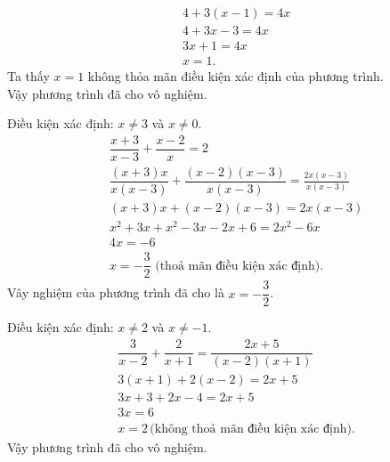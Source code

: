 \begin{vd}
{\begin{listEX}
\begin{align*}
	&4+3(x-1) = 4x\\
	&4+3x-3 = 4x\\
	&3x+1 =4x\\
	&x = 1.
	\end{align*}
	Ta thấy $x=1$ không thỏa mãn điều kiện xác định của phương trình.\\
	Vậy phương trình đã cho vô nghiệm.
	\item Điều kiện xác định: $x \neq 3$ và $x \neq 0$.
	\begin{align*}
	&\dfrac{x+3}{x-3}+\dfrac{x-2}{x}=2 \\
	& \dfrac{(x+3) x}{x(x-3)}+\dfrac{(x-2)(x-3)}{x(x-3)}=\frac{2 x(x-3)}{x(x-3)} \\
	& (x+3) x+(x-2)(x-3)=2 x(x-3) \\
	& x^2+3 x+x^2-3 x-2 x+6=2 x^2-6 x \\
	& 4 x=-6 \\
	& x=-\dfrac{3}{2} \text { (thoả mãn điều kiện xác định). }
	\end{align*}
	Vây nghiệm của phương trình đã cho là $x=-\dfrac{3}{2}$.\\
	\item Điều kiện xác định: $x \neq 2$ và $x \neq-1$.
	\begin{align*}
	& \dfrac{3}{x-2}+\dfrac{2}{x+1}=\dfrac{2 x+5}{(x-2)(x+1)} \\
	& 3(x+1)+2(x-2)=2 x+5 \\
	& 3 x+3+2 x-4=2 x+5 \\
	& 3 x=6\\
	& x=2\, \text{(không thoả mãn điều kiện xác định).}
	\end{align*}
	Vậy phương trình đã cho vô nghiệm.
	\end{listEX}
	}
\end{vd}
